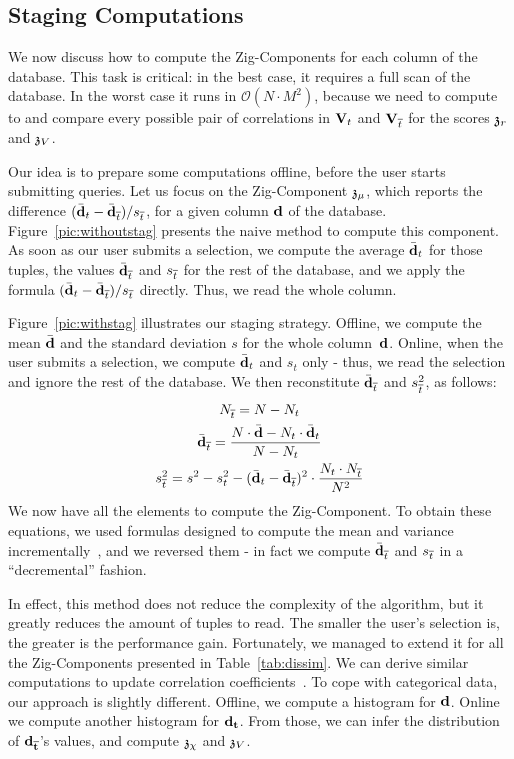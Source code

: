 \subsection{Staging Computations}
\label{sec:optimization}

We now discuss how to compute the Zig-Components for each column of the
database. This task is critical: in the best case, it requires a full scan of
the database. In the worst case it runs in $\mathcal{O}(N \cdot M^2)$, because
we need to compute to and compare every possible pair of correlations in
$\mathbf{V}_t$ and $\mathbf{V}_{\overline{t}}$ for the scores $\mathfrak{z}_r$ and $\mathfrak{z}_V$.

Our idea is to prepare some computations offline, before the user starts
submitting queries.  Let us focus on the Zig-Component $\mathfrak{z}_\mu$, which
reports the difference $(\bar{\bf{d}}_t - \bar{\bf{d}}_{\overline{t}})/{s_{\overline{t}}}$,
for a given column $\bf{d}$ of the database.  Figure~\ref{pic:withoutstag}
presents the naive method to compute this component.  As soon as our user
submits a selection, we compute the average $\bar{\bf{d}}_t$ for those tuples,
the values $\bar{\bf{d}}_{\overline{t}}$ and $s_{\overline{t}}$ for the rest of the database,
and we apply the formula $(\bar{\bf{d}}_t - \bar{\bf{d}}_{\overline{t}})/{s_{\overline{t}}}$
directly. Thus, we read the whole column.

Figure~\ref{pic:withstag} illustrates our staging strategy. Offline, we compute
the mean $\bar{\bf{d}}$ and the standard deviation $s$ for the whole
column~$\bf{d}$. Online, when the user submits a selection, we compute
$\bar{\bf{d}}_t$ and $s_t$
only - thus, we read the selection and ignore the rest of the database. We then
reconstitute $\bar{\bf{d}}_{\overline{t}}$ and $s_{\overline{t}}^2$, as follows:
\begin{gather}
    N_{\overline{t}} = N - N_t\\
    \bar{\bf{d}}_{\overline{t}}= \frac{ N \cdot \bar{\bf{d}} -  N_t \cdot \bar{\bf{d}}_t } { N - N_t } \\
    s_{\overline{t}}^2 = s^2 - s_t^2 -
    (\bar{\bf{d}}_t - \bar{\bf{d}}_{\overline{t}})^2 \cdot \frac{N_t \cdot N_{\overline{t}}}{N^2}
\end{gather}
We now have all the elements to compute the Zig-Component. To obtain these
equations, we used formulas designed to compute the mean and variance
incrementally~\cite{pebay2008formulas}, and we reversed them - in fact we
compute $\bar{\bf{d}}_{\overline{t}}$ and $s_{\overline{t}}$ in a ``decremental'' fashion.

In effect, this method does not reduce the complexity of the algorithm, but it
greatly reduces the amount of tuples to read. The smaller the user's selection
is, the greater is the performance gain. Fortunately, we managed to extend it
for all the Zig-Components presented in Table~\ref{tab:dissim}.  We can derive
similar computations to update correlation
coefficients~\cite{pebay2008formulas}. To cope with categorical data, our
approach is slightly different. Offline, we compute a histogram for $\bf{d}$.
Online we compute another histogram for $\bf{d}_t$. From those, we can infer
the distribution of $\bf{d}_{\overline{t}}$'s values, and compute $\mathfrak{z}_\chi$ and
$\mathfrak{z}_V$.

